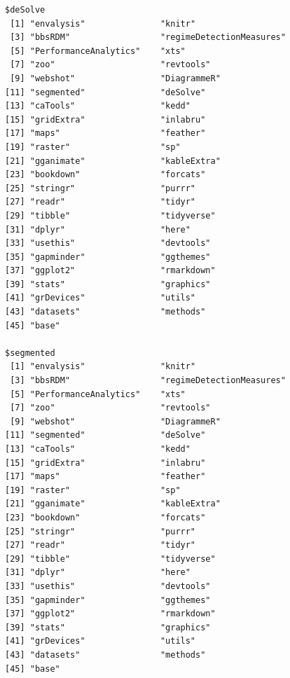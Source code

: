 \documentclass[12pt,twoside,openany]{reedthesis}
\begin{document}
\begin{verbatim}
$deSolve
 [1] "envalysis"               "knitr"                  
 [3] "bbsRDM"                  "regimeDetectionMeasures"
 [5] "PerformanceAnalytics"    "xts"                    
 [7] "zoo"                     "revtools"               
 [9] "webshot"                 "DiagrammeR"             
[11] "segmented"               "deSolve"                
[13] "caTools"                 "kedd"                   
[15] "gridExtra"               "inlabru"                
[17] "maps"                    "feather"                
[19] "raster"                  "sp"                     
[21] "gganimate"               "kableExtra"             
[23] "bookdown"                "forcats"                
[25] "stringr"                 "purrr"                  
[27] "readr"                   "tidyr"                  
[29] "tibble"                  "tidyverse"              
[31] "dplyr"                   "here"                   
[33] "usethis"                 "devtools"               
[35] "gapminder"               "ggthemes"               
[37] "ggplot2"                 "rmarkdown"              
[39] "stats"                   "graphics"               
[41] "grDevices"               "utils"                  
[43] "datasets"                "methods"                
[45] "base"                   

$segmented
 [1] "envalysis"               "knitr"                  
 [3] "bbsRDM"                  "regimeDetectionMeasures"
 [5] "PerformanceAnalytics"    "xts"                    
 [7] "zoo"                     "revtools"               
 [9] "webshot"                 "DiagrammeR"             
[11] "segmented"               "deSolve"                
[13] "caTools"                 "kedd"                   
[15] "gridExtra"               "inlabru"                
[17] "maps"                    "feather"                
[19] "raster"                  "sp"                     
[21] "gganimate"               "kableExtra"             
[23] "bookdown"                "forcats"                
[25] "stringr"                 "purrr"                  
[27] "readr"                   "tidyr"                  
[29] "tibble"                  "tidyverse"              
[31] "dplyr"                   "here"                   
[33] "usethis"                 "devtools"               
[35] "gapminder"               "ggthemes"               
[37] "ggplot2"                 "rmarkdown"              
[39] "stats"                   "graphics"               
[41] "grDevices"               "utils"                  
[43] "datasets"                "methods"                
[45] "base"                   


\end{verbatim}
\end{document}
